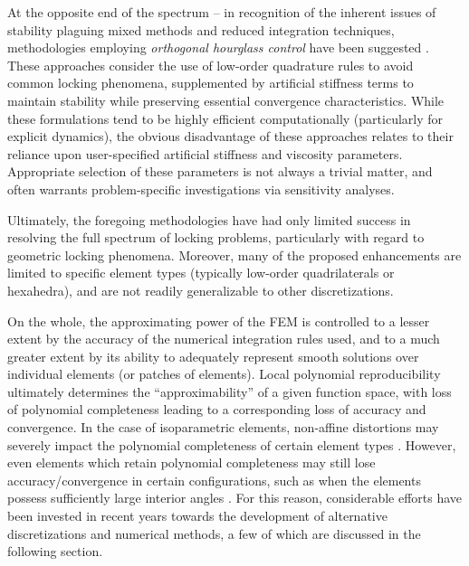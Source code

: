 		At the opposite end of the spectrum -- in recognition of the inherent issues of stability plaguing mixed methods and reduced integration techniques, methodologies employing \textit{orthogonal hourglass control} have been suggested \cite{Flanagan:81}. These approaches consider the use of low-order quadrature rules to avoid common locking phenomena, supplemented by artificial stiffness terms to maintain stability while preserving essential convergence characteristics. While these formulations tend to be highly efficient computationally (particularly for explicit dynamics), the obvious disadvantage of these approaches relates to their reliance upon user-specified artificial stiffness and viscosity parameters. Appropriate selection of these parameters is not always a trivial matter, and often warrants problem-specific investigations via sensitivity analyses.
			
		Ultimately, the foregoing methodologies have had only limited success in resolving the full spectrum of locking problems, particularly with regard to geometric locking phenomena. Moreover, many of the proposed enhancements are limited to specific element types (typically low-order quadrilaterals or hexahedra), and are not readily generalizable to other discretizations.
		
		On the whole, the approximating power of the FEM is controlled to a lesser extent by the accuracy of the numerical integration rules used, and to a much greater extent by its ability to adequately represent smooth solutions over individual elements (or patches of elements). Local polynomial reproducibility ultimately determines the ``approximability'' of a given function space, with loss of polynomial completeness leading to a corresponding loss of accuracy and convergence. In the case of isoparametric elements, non-affine distortions may severely impact the polynomial completeness of certain element types \cite{Lee&Bathe:93}. However, even elements which retain polynomial completeness may still lose accuracy/convergence in certain configurations, such as when the elements possess sufficiently large interior angles \cite{Acosta:00}. For this reason, considerable efforts have been invested in recent years towards the development of alternative discretizations and numerical methods, a few of which are discussed in the following section.
		
